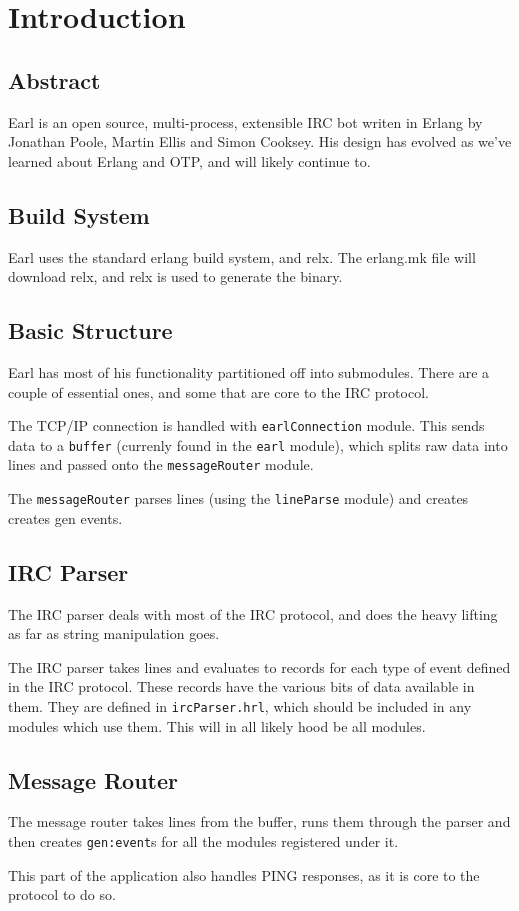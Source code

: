 \documentclass[12pt]{article}
\begin{document}

\section*{Introduction}

\subsection*{Abstract}

Earl is an open source, multi-process, extensible IRC bot writen in Erlang by
Jonathan Poole, Martin Ellis and Simon Cooksey.  His design has evolved as we've
learned about Erlang and OTP, and will likely continue to.

\subsection*{Build System}

Earl uses the standard erlang build system, and relx. The erlang.mk file will
download relx, and relx is used to generate the binary.


\subsection*{Basic Structure}

Earl has most of his functionality partitioned off into submodules. There are a
couple of essential ones, and some that are core to the IRC protocol.

The TCP/IP connection is handled with \texttt{earlConnection} module. This sends
data to a \texttt{buffer} (currenly found in the \texttt{earl} module), which
splits raw data into lines and passed onto the \texttt{messageRouter} module.

The \texttt{messageRouter} parses lines (using the \texttt{lineParse} module)
and creates creates gen events.

\subsection*{IRC Parser}

The IRC parser deals with most of the IRC protocol, and does the heavy lifting
as far as string manipulation goes.

The IRC parser takes lines and evaluates to records for each type of event 
defined in the IRC protocol. These records have the various bits of data 
available in them. They are defined in \texttt{ircParser.hrl}, which should be
included in any modules which use them. This will in all likely hood be all 
modules.

\subsection*{Message Router}

The message router takes lines from the buffer, runs them through the parser 
and then creates \texttt{gen:event}s for all the modules registered under it.

This part of the application also handles PING responses, as it is core to the
protocol to do so. 
\end{document}
